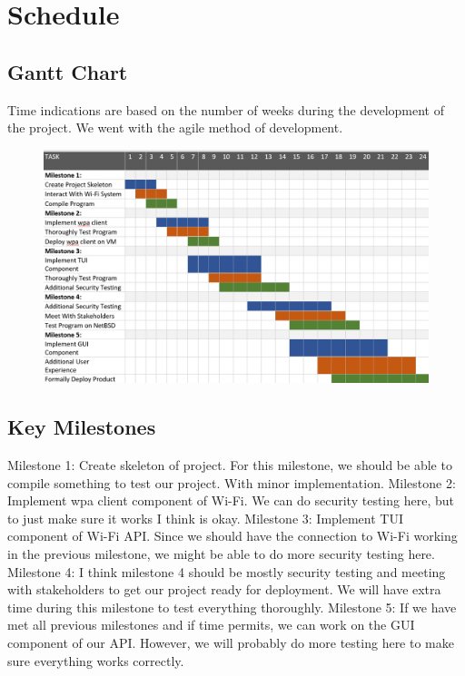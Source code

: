 \section{Schedule}

\subsection{Gantt Chart}

Time indications are based on the number of weeks during the development of the project. We went with the agile method of development. 

\begin{figure}[!htb]
\includegraphics[scale=0.40]{ganttChart.png}
\end{figure}

\subsection{Key Milestones}

Milestone 1: Create skeleton of project. For this milestone, we should be able to compile something to test our project. With minor implementation. 
Milestone 2: Implement wpa client component of Wi-Fi. We can do security testing here, but to just make sure it works I think is okay. 
Milestone 3: Implement TUI component of Wi-Fi API. Since we should have the connection to Wi-Fi working in the previous milestone, we might be able 
to do more security testing here. 
Milestone 4: I think milestone 4 should be mostly security testing and meeting with stakeholders to get our project ready for deployment. We will have 
extra time during this milestone to test everything thoroughly. 
Milestone 5: If we have met all previous milestones and if time permits, we can work on the GUI component of our API. However, we will probably do more 
testing here to make sure everything works correctly. 

